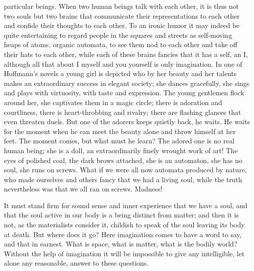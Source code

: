\documentclass[12pt,a4paper,openany]{book}
\newcommand{\opage}[1]{\marginnote{\footnotesize\textit{[#1]}}}
\begin{document}
particular beings. When two human beings talk with each other, it is thus not two souls but two brains that
communicate their representations to each other and confide their thoughts to each other. To an ironic humor it may
indeed be quite entertaining to regard people in the squares and streets as self-moving heaps of atoms, organic
automata, to see them nod to each other and take off their hats to each other,
\setcounter{footnote}{0}%
\opage{20}while each of these brains fancies that it has a self, an I, although all that about I myself and you
yourself is only imagination. In one of Hoffmann's novels a young girl is depicted who by her beauty and her talents
makes an extraordinary success in elegant society; she dances gracefully, she sings and plays with virtuosity, with
taste and expression. The young gentlemen flock around her, she captivates them in a magic circle; there is adoration
and courtliness, there is heart-throbbing and rivalry; there are flashing glances that even threaten duels. But one of
the adorers keeps quietly back, he waits. He waits for the moment when he can meet the beauty alone and throw himself
at her feet. The moment comes, but what must he learn? The adored one is no real human being; she is a doll, an
extraordinarily finely wrought work of art! The eyes of polished coal, the dark brows attached, she is an automaton,
she has no soul, she runs on screws. What if we were all now automata produced by nature, who made ourselves and others
fancy that we had a living soul, while the truth nevertheless was that we all ran on screws. Madness!

It must stand firm for sound sense and inner experience that we have a soul, and that the soul active in our body is a
being distinct from matter; and then it is not, as the materialists consider it, childish to speak of the soul leaving
its body at death. But where does it go? Here imagination comes to have a word to say, and that in earnest. What is
space, what is matter, what is the bodily world? Without the help of imagination it will
\setcounter{footnote}{0}%
\opage{21}be impossible to give any intelligible, let alone any reasonable, answer to these questions.
\end{document}
